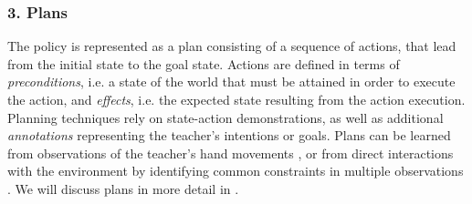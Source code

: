 \subsubsection{3. Plans}\label{sssec:Plans}
The policy is represented as a plan consisting of a sequence of actions, that lead from the initial state to the goal state.
Actions are defined in terms of \textit{preconditions}, i.e. a state of the world that must be attained in order to execute the action, and \textit{effects}, i.e. the expected state resulting from the action execution. 
Planning techniques rely on state-action demonstrations, as well as additional \textit{annotations} representing the teacher's intentions or goals.
Plans can be learned from observations of the teacher's hand movements \cite{kuniyoshi1994learning}, or from direct interactions with the environment by identifying common constraints in multiple observations \cite{ekvall2008robot}.
We will discuss plans in more detail in .


